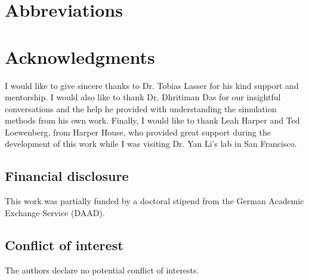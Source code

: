 \documentclass[AMA,LATO1COL]{WileyNJD-v2}
\begin{document}



\maketitle








\glsaddall
\section*{Abbreviations}
\begin{multicols}{3}
\printglossary[type=\acronymtype, nonumberlist]
\end{multicols}

\section*{Acknowledgments}
I would like to give sincere thanks to Dr. Tobias Lasser for his kind support and mentorship. I would also like to thank Dr. Dhritiman Das for our insightful conversations and the help he provided with understanding the simulation methods from his own work. Finally, I would like to thank Leah Harper and Ted Loewenberg, from Harper House, who provided great support during the development of this work while I was visiting Dr. Yan Li's lab in San Francisco. 

\subsection*{Financial disclosure}
This work was partially funded by a doctoral stipend from the German Academic Exchange Service (DAAD).

\subsection*{Conflict of interest}
The authors declare no potential conflict of interests.

% 



\end{document}
